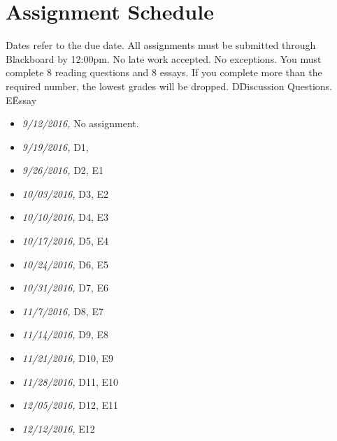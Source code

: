 \documentclass[article,oneside]{memoir}
\begin{document}
\section{ Assignment Schedule}
Dates refer to the due date. All assignments must be submitted through Blackboard by 12:00pm. No late work accepted. No exceptions. You must complete 8 reading questions and 8 essays. If you complete more than the required number, the lowest grades will be dropped. D\=Discussion Questions. E\=Essay
\begin{itemize}
\item \textit{9/12/2016,} No assignment.  
\item \textit{9/19/2016,} D1,
\item \textit{9/26/2016,} D2, E1
\item \textit{10/03/2016,} D3, E2
\item \textit{10/10/2016,} D4, E3
\item \textit{10/17/2016,} D5, E4
\item \textit{10/24/2016,}  D6, E5
\item \textit{10/31/2016,} D7, E6
\item \textit{11/7/2016,}  D8, E7
\item \textit{11/14/2016,} D9, E8
\item \textit{11/21/2016,} D10, E9
\item \textit{11/28/2016,} D11, E10
\item \textit{12/05/2016,} D12, E11
\item \textit{12/12/2016,} E12
\end{itemize}




\end{document}
